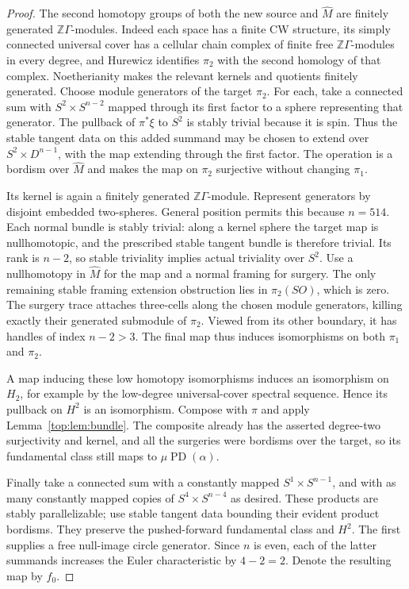 \documentclass[11pt]{article}
\numberwithin{equation}{section}
\theoremstyle{definition}
\theoremstyle{remark}
\newcommand{\Z}{\mathbb Z}
\newcommand{\PD}{\operatorname{PD}}
\begin{document}
\begin{proof}
The second homotopy groups of both the new source and $\widehat M$ are
finitely generated $\Z\Gamma$-modules.  Indeed each space has a finite
CW structure, its simply connected universal cover has a cellular chain
complex of finite free $\Z\Gamma$-modules in every degree, and
Hurewicz identifies $\pi_2$ with the second homology of that complex.
Noetherianity makes the relevant kernels and quotients finitely
generated.  Choose module generators of the target $\pi_2$.  For each,
take a connected sum with $S^2\times S^{n-2}$ mapped through its first
factor to a sphere representing that generator.  The pullback of
$\pi^*\xi$ to $S^2$ is stably trivial because it is spin.  Thus the
stable tangent data on this added summand may be chosen to extend over
$S^2\times D^{n-1}$, with the map extending through the first factor.
The operation is a bordism over $\widehat M$ and makes the map on
$\pi_2$ surjective without changing $\pi_1$.

Its kernel is again a finitely generated $\Z\Gamma$-module.  Represent
generators by disjoint embedded two-spheres.  General position permits
this because $n=514$.  Each normal bundle is stably trivial: along a
kernel sphere the target map is nullhomotopic, and the prescribed stable
tangent bundle is therefore trivial.  Its rank is $n-2$, so stable
triviality implies actual triviality over $S^2$.  Use a nullhomotopy in
$\widehat M$ for the map and a normal framing for surgery.  The only
remaining stable framing extension obstruction lies in $\pi_2(SO)$,
which is zero.  The surgery trace attaches three-cells along the chosen
module generators, killing exactly their generated submodule of
$\pi_2$.  Viewed from its other boundary, it has handles of index
$n-2>3$.  The final map thus induces isomorphisms on both $\pi_1$ and
$\pi_2$.

A map inducing these low homotopy isomorphisms induces an isomorphism
on $H_2$, for example by the low-degree universal-cover spectral
sequence.  Hence its pullback on $H^2$ is an isomorphism.  Compose with
$\pi$ and apply Lemma~\ref{top:lem:bundle}.  The composite already has
the asserted degree-two surjectivity and kernel, and all the surgeries
were bordisms over the target, so its fundamental class still maps to
$\mu\PD(\alpha)$.

Finally take a connected sum with a constantly mapped
$S^1\times S^{n-1}$, and with as many constantly mapped copies of
$S^4\times S^{n-4}$ as desired.  These products are stably
parallelizable; use stable tangent data bounding their evident product
bordisms.  They preserve the pushed-forward fundamental class and
$H^2$.  The first supplies a free null-image circle generator.  Since
$n$ is even, each of the latter summands increases the Euler
characteristic by $4-2=2$.  Denote the resulting map by $f_0$.


\end{proof}
\end{document}
